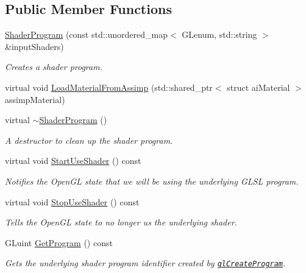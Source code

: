 \subsection*{Public Member Functions}
\begin{DoxyCompactItemize}
\item 
\hyperlink{class_shader_program_aba2db5734b2f70cc34078126ad279588}{Shader\+Program} (const std\+::unordered\+\_\+map$<$ G\+Lenum, std\+::string $>$ \&input\+Shaders)
\begin{DoxyCompactList}\small\item\em Creates a shader program. \end{DoxyCompactList}\item 
virtual void \hyperlink{class_shader_program_a51ac6fbf3a3d88643eef303a4c3a1fa8}{Load\+Material\+From\+Assimp} (std\+::shared\+\_\+ptr$<$ struct ai\+Material $>$ assimp\+Material)
\item 
virtual \hyperlink{class_shader_program_a2d2eadcfc48cc2e2ddb82aba70553a9f}{$\sim$\+Shader\+Program} ()
\begin{DoxyCompactList}\small\item\em A destructor to clean up the shader program. \end{DoxyCompactList}\item 
virtual void \hyperlink{class_shader_program_aab1241c0f0962d43687d92866d7b7d6a}{Start\+Use\+Shader} () const
\begin{DoxyCompactList}\small\item\em Notifies the Open\+GL state that we will be using the underlying G\+L\+SL program. \end{DoxyCompactList}\item 
virtual void \hyperlink{class_shader_program_a2f2ae9ab4849f855becccfaa445d00d5}{Stop\+Use\+Shader} () const
\begin{DoxyCompactList}\small\item\em Tells the Open\+GL state to no longer us the underlying shader. \end{DoxyCompactList}\item 
G\+Luint \hyperlink{class_shader_program_a7313b3596bcd6d982d9624a46cc2acc6}{Get\+Program} () const
\begin{DoxyCompactList}\small\item\em Gets the underlying shader program identifier created by \href{https://www.opengl.org/sdk/docs/man/html/glCreateProgram.xhtml}{\tt gl\+Create\+Program}. \end{DoxyCompactList}\item 

\end{DoxyCompactItemize}
